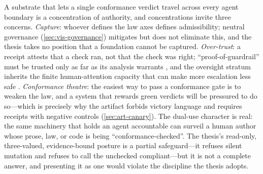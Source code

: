 A substrate that lets a single conformance verdict travel across every agent
boundary is a concentration of authority, and concentrations invite three concerns.
\emph{Capture}: whoever defines the law axes defines admissibility; neutral
governance (\cref{sec:vis-governance}) mitigates but does not eliminate this, and
the thesis takes no position that a foundation cannot be captured. \emph{Over-trust}:
a receipt attests that a check ran, not that the check was right; ``proof-of-guardrail''
must be trusted only as far as its analysis warrants \citep{jin26guardrail}, and the
oversight stratum inherits the finite human-attention capacity that can make more
escalation less safe \citep{turan26}. \emph{Conformance theatre}: the easiest way to
pass a conformance gate is to weaken the law, and a system that rewards green
verdicts will be pressured to do so---which is precisely why the artifact forbids
victory language and requires receipts with negative controls
(\cref{sec:art-canary}). The dual-use character is real: the same machinery that
holds an agent accountable can surveil a human author whose prose, law, or code is
being ``conformance-checked''. The thesis's read-only, three-valued, evidence-bound
posture is a partial safeguard---it refuses silent mutation and refuses to call the
unchecked compliant---but it is not a complete answer, and presenting it as one would
violate the discipline the thesis adopts.
